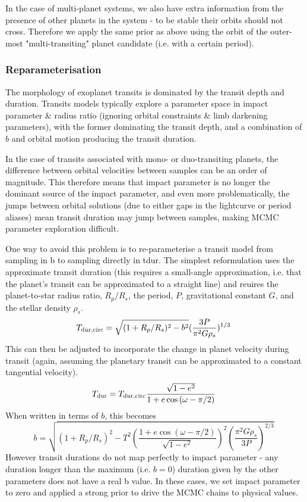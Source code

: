 \documentclass{article}
\begin{document}
In the case of multi-planet systems, we also have extra information from the presence of other planets in the system - to be stable their orbits should not cross.
Therefore we apply the same prior as above using the orbit of the outer-most "multi-transiting" planet candidate (i.e. with a certain period). 

\subsubsection{Reparameterisation}

The morphology of exoplanet transits is dominated by the transit depth and duration. 
Transits models typically explore a parameter space in impact parameter \& radius ratio  (ignoring orbital constraints \& limb darkening parameters), with the former dominating the transit depth, and a combination of $b$ and orbital motion producing the transit duration.

In the case of transits associated with mono- or duo-transiting planets, the difference between orbital velocities between samples can be an order of magnitude. 
This therefore means that impact parameter is no longer the dominant source of the impact parameter, and even more problematically, the jumps between orbital solutions (due to either gaps in the lightcurve or period aliases) mean transit duration may jump between samples, making MCMC parameter exploration difficult.

One way to avoid this problem is to re-parameterise a transit model from sampling in b to sampling directly in tdur.
The simplest reformulation uses the approximate transit duration (this requires a small-angle approximation, i.e. that the planet's transit can be approximated to a straight line) and reuires the planet-to-star radius ratio, $R_p/R_s$, the period, $P$, gravitational constant $G$, and the stellar density $\rho_s$.
\begin{equation}
T_{\rm dur, circ} = \sqrt{(1+R_p/R_s)^2 - b^2} (\frac{3 P}{\pi^2 G \rho_s})^{1/3}  \;
\end{equation}
This can then be adjusted to incorporate the change in planet velocity during transit (again, assuming the planetary transit can be approximated to a constant tangential velocity).
\begin{equation}
T_{\rm dur} = T_{\rm dur, circ} \frac{\sqrt{1-e^2}}{1+e\cos{(\omega - \pi/2)}} \;
\end{equation}
When written in terms of $b$, this becomes
\begin{equation}
b = \sqrt{(1+R_p/R_s)^2 - T^2 (\frac{1+e\cos{(\omega - \pi/2)}}{\sqrt{1-e^2}})^2 (\frac{\pi^2G\rho_s}{3P})^{2/3}} \;
\end{equation}
However transit durations do not map perfectly to impact parameter - any duration longer than the maximum (i.e. $b=0$) duration given by the other parameters does not have a real b value.
In these cases, we set impact parameter to zero and applied a strong prior to drive the MCMC chains to physical values.
\end{document}
